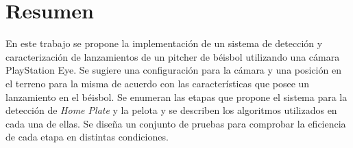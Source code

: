 \chapter*{Resumen}\label{chapter:abstract}

En este trabajo se propone la implementación de un sistema de detección y caracterización de lanzamientos de un pitcher de béisbol utilizando una cámara PlayStation Eye. Se sugiere una configuración para la cámara y una posición en el terreno para la misma de acuerdo con las características que posee un lanzamiento en el béisbol. Se enumeran las etapas que propone el sistema para la detección de \textit{Home Plate} y la pelota y se describen los algoritmos utilizados en cada una de ellas. Se diseña un conjunto de pruebas para comprobar la eficiencia de cada etapa en distintas condiciones.
